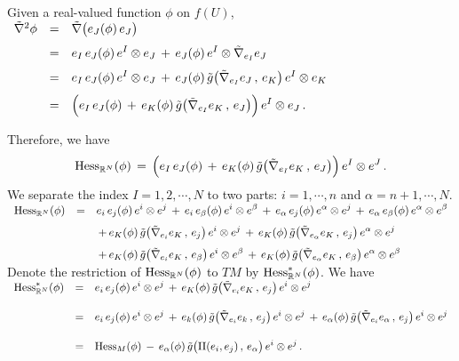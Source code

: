 \documentclass{article}[12pt,a4paper]
\begin{document}
Given a real-valued function $\phi$ on $f(U)$, \\[0.1in]
$\begin{array}{rcl}
\tilde{\nabla}^2 \phi &=& \displaystyle \tilde{\nabla}\big(e_J(\phi)\, e_J \big) \\[0.1in]
&=& \displaystyle 
	e_I\,e_J(\phi)\, e^I \otimes e_J \,+\, e_J(\phi)\, e^I \otimes {\tilde\nabla}_{e_I} e_J \\[0.1in]
&=& \displaystyle 
	e_I\,e_J(\phi)\, e^I \otimes e_J \,+\, e_J(\phi)\, \tilde{g}\big({\tilde\nabla}_{e_I} e_J\,,\, e_K\big)\, e^I\otimes e_K \\[0.1in]
&=& \displaystyle 
	\Big( e_I\,e_J(\phi) \,+\, e_K(\phi)\, \tilde{g}\big({\tilde\nabla}_{e_I} e_K\,,\, e_J\big)\Big)\, e^I\otimes e_J \,. \\
\end{array}$
\newpage

Therefore, we have 
$$ \mbox{Hess}_{\mR^N}(\phi) 
\,=\, \Big( e_I\,e_J(\phi) \,+\, e_K(\phi)\, \tilde g\big({\tilde\nabla}_{e_I} e_K\,,\, e_J\big)\Big)\, e^I\otimes e^J\,.$$
We separate the index $I=1,2,\cdots,N$ to two parts: $i=1,\cdots,n$ and $\alpha=n+1,\cdots,N$. \\[0.2in] 
$\begin{array}{rcl}
\mbox{Hess}_{\mR^N}(\phi) &=& \ds 
	e_i\,e_j(\phi) \, e^i\otimes e^j \,+\, e_i\,e_\beta(\phi) \, e^i\otimes e^\beta 
	\,+\, e_\alpha\,e_j(\phi) \, e^\alpha\otimes e^j \,+\, e_\alpha\,e_\beta(\phi) \, e^\alpha\otimes e^\beta \\[0.1in]
&& \ds 
	\,+\, e_K(\phi)\, \tilde{g}\big({\tilde\nabla}_{e_i} e_K\,,\, e_j\big)\, e^i\otimes e^j 
	\,+\, e_K(\phi)\, \tilde{g}\big({\tilde\nabla}_{e_\alpha} e_K\,,\, e_j\big)\, e^\alpha\otimes e^j \\[0.1in]

&& \ds 
	\,+\, e_K(\phi)\, \tilde{g}\big({\tilde\nabla}_{e_i} e_K\,,\, e_\beta\big)\, e^i\otimes e^\beta 
	\,+\, e_K(\phi)\, \tilde{g}\big({\tilde\nabla}_{e_\alpha} e_K\,,\, e_\beta\big)\, e^\alpha\otimes e^\beta
\end{array}$ \\[0.1in]

Denote the restriction of $\mbox{Hess}_{\mathbb{R}^N}(\phi)$ to $TM$ by $\mbox{Hess}_{\mathbb{R}^N}^*(\phi)$. We have \\[0.2in]
$\begin{array}{rcl}
\mbox{Hess}_{\mathbb{R}^N}^*(\phi) &=& \displaystyle
	e_i\,e_j(\phi) \, e^i\otimes e^j \,+\, e_K(\phi)\, \tilde{g}\big({\tilde\nabla}_{e_i} e_K\,,\, e_j\big)\, e^i\otimes e^j \\[0.2in]
&=& \displaystyle 
	e_i\,e_j(\phi) \, e^i\otimes e^j \,+\, e_k(\phi)\, \tilde{g}\big({\tilde\nabla}_{e_i} e_k\,,\, e_j\big)\, e^i\otimes e^j
	\,+\, e_\alpha(\phi)\, \tilde{g}\big({\tilde\nabla}_{e_i} e_\alpha \,,\, e_j\big)\, e^i\otimes e^j \\[0.2in]
&=& \displaystyle 
	\mbox{Hess}_M(\phi) \,-\, e_\alpha(\phi) \, \tilde{g}\big(\mbox{II}(e_i, e_j)\,,\, e_\alpha\big)\, e^i\otimes e^j\,. 
\end{array}$ \\[0.1in]
\end{document}
